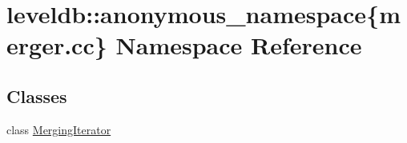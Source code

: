 \hypertarget{namespaceleveldb_1_1anonymous__namespace_02merger_8cc_03}{}\section{leveldb\+:\+:anonymous\+\_\+namespace\{merger.\+cc\} Namespace Reference}
\label{namespaceleveldb_1_1anonymous__namespace_02merger_8cc_03}
\subsection*{Classes}
\begin{DoxyCompactItemize}
\item 
class \hyperlink{classleveldb_1_1anonymous__namespace_02merger_8cc_03_1_1_merging_iterator}{Merging\+Iterator}
\end{DoxyCompactItemize}
